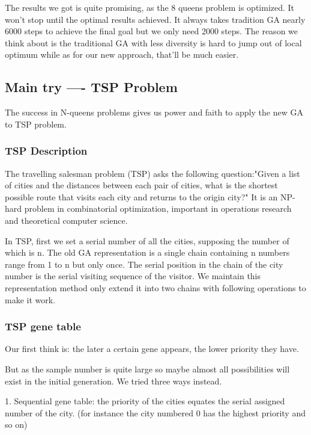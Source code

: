 \documentclass{acmtog} %
\begin{document}
The results we got is quite promising, as the 8 queens problem is optimized. It won't stop until the optimal results achieved. It always takes tradition GA nearly 6000 steps to achieve the final goal but we only need 2000 steps. The reason we think about is the traditional GA with less diversity is hard to jump out of local optimum while as for our new approach, that'll be much easier. 


\subsection{Main try ---- TSP Problem}
\label{subsec:tsp}
The success in N-queens problems gives us power and faith to apply the new GA to TSP problem.

\subsubsection{TSP Description}
\label{subsubsec:tspdescription}
\qquad

The travelling salesman problem (TSP) asks the following question:"Given a list of cities and the distances between each pair of cities, what is the shortest possible route that visits each city and returns to the origin city?" It is an NP-hard problem in combinatorial optimization, important in operations research and theoretical computer science. 

In TSP, first we set a serial number of all the cities, supposing the number of which is n. The old GA representation is a single chain containing n numbers range from 1 to n but only once. The serial position in the chain of the city number is the serial visiting sequence of the visitor. We maintain this representation method only extend it into two chains with following operations to make it work.

\subsubsection{TSP gene table}
\label{subsubsec:tspgenetable}
\qquad

Our first think is: the later a certain gene appears, the lower priority they have.

But as the sample number is quite large so maybe almost all possibilities will exist in the initial generation. We tried three ways instead.

1. Sequential gene table: the priority of the cities equates the serial assigned number of the city. (for instance the city numbered 0 has the highest priority and so on)
\end{document}
